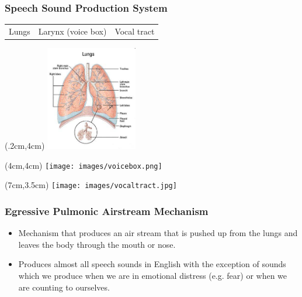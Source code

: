 \documentclass[12pt, table]{beamer}
\begin{document}
\begin{frame}
\frametitle{Speech Sound Production System}
\begin{tabularx}{\textwidth}{Y YY}
Lungs & Larynx (voice box) & Vocal tract\\[5cm]
\end{tabularx}
\begin{textblock*}{.2cm}(.2cm,4cm)
\includegraphics[width=4cm]{images/lungs.png}
\end{textblock*}
\begin{textblock*}{4cm}(4cm,4cm)
\texttt{[image: images/voicebox.png]}
\end{textblock*}
\begin{textblock*}{6cm}(7cm,3.5cm)
\texttt{[image: images/vocaltract.jpg]}
\end{textblock*}
\end{frame}

\begin{frame}
\frametitle{Egressive Pulmonic Airstream Mechanism}
\begin{itemize}
\item Mechanism that produces an air stream that is pushed up from the lungs and leaves the body through the mouth or nose.
\item Produces almost all speech sounds in English with the exception of sounds which we produce when we are in emotional distress (e.g. fear) or when we are counting to ourselves.
\end{itemize}
\end{frame}
\end{document}
